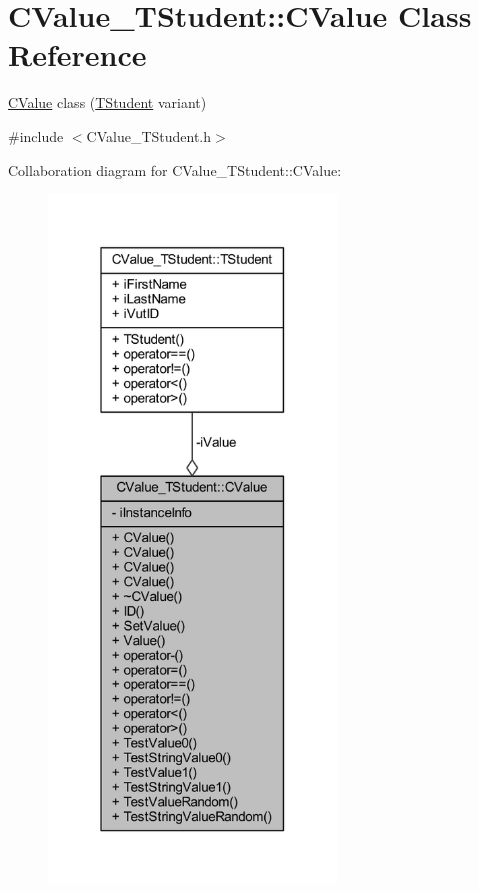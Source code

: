 \hypertarget{class_c_value___t_student_1_1_c_value}{}\section{C\+Value\+\_\+\+T\+Student\+:\+:C\+Value Class Reference}
\label{class_c_value___t_student_1_1_c_value}


\hyperlink{class_c_value___t_student_1_1_c_value}{C\+Value} class ({\ttfamily \hyperlink{struct_c_value___t_student_1_1_t_student}{T\+Student}} variant)  




{\ttfamily \#include $<$C\+Value\+\_\+\+T\+Student.\+h$>$}



Collaboration diagram for C\+Value\+\_\+\+T\+Student\+:\+:C\+Value\+:
\nopagebreak
\begin{figure}[H]
\begin{center}
\leavevmode
\includegraphics[width=217pt]{class_c_value___t_student_1_1_c_value__coll__graph}
\end{center}
\end{figure}
